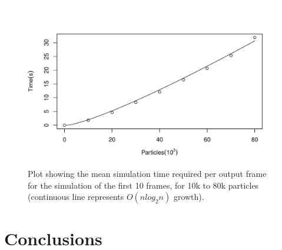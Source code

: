 \documentclass{llncs}
\begin{document}
\begin{figure}
  \includegraphics[width=\textwidth]{figures/performance.pdf}
  \caption{Plot showing the mean simulation time required per output frame for the
    simulation of the first 10 frames, for 10k to 80k particles (continuous line
    represents $O(n log_2n)$ growth).}
  \label{fig:performance}
\end{figure}

\section{Conclusions}
\end{document}
